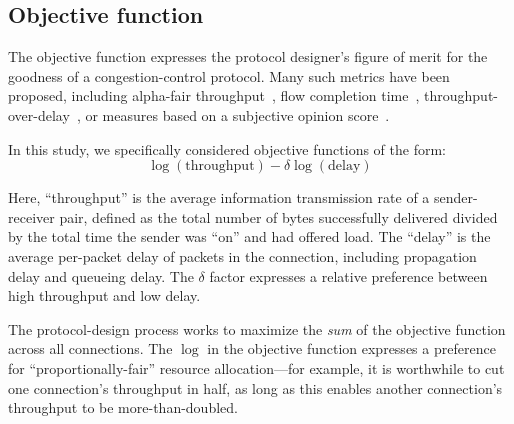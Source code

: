 \subsection{Objective function}
\label{ss:objective}
The objective function expresses the protocol designer's figure of
merit for the goodness of a congestion-control protocol. Many such
metrics have been proposed, including alpha-fair
throughput~\cite{Srikant}, flow completion time~\cite{dctcp},
throughput-over-delay~\cite{codelID}, or measures based on a
subjective opinion score~\cite{MOSCC}.

In this study, we specifically considered objective functions of the
form:
\begin{equation}
\log\left( \textrm{throughput} \right)  - \delta \log\left( \textrm{delay} \right)
\end{equation}

Here, ``throughput'' is the average information transmission rate of a
sender-receiver pair, defined as the total number of bytes
successfully delivered divided by the total time the sender was ``on''
and had offered load. The ``delay'' is the average per-packet delay of
packets in the connection, including propagation delay and queueing
delay. The $\delta$ factor expresses a relative preference between high throughput and low delay.

The protocol-design process works to maximize the \emph{sum} of the
objective function across all connections. The $\log$ in the objective
function expresses a preference for ``proportionally-fair'' resource
allocation---for example, it is worthwhile to cut one connection's
throughput in half, as long as this enables another connection's
throughput to be more-than-doubled.

